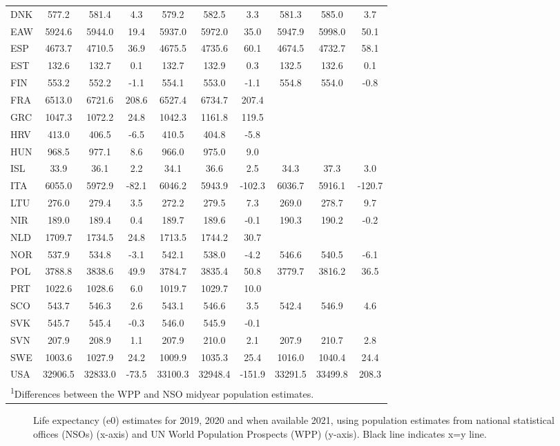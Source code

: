 \documentclass[12pt]{article}
\begin{document}
\begin{table}[ht]
\begin{tabular}{lccc|ccc|ccc}
DNK & 577.2 & 581.4 & 4.3 & 579.2 & 582.5 & 3.3 & 581.3 & 585.0 & 3.7\\
EAW & 5924.6 & 5944.0 & 19.4 & 5937.0 & 5972.0 & 35.0 & 5947.9 & 5998.0 & 50.1\\
ESP & 4673.7 & 4710.5 & 36.9 & 4675.5 & 4735.6 & 60.1 & 4674.5 & 4732.7 & 58.1\\
EST & 132.6 & 132.7 & 0.1 & 132.7 & 132.9 & 0.3 & 132.5 & 132.6 & 0.1\\
FIN & 553.2 & 552.2 & -1.1 & 554.1 & 553.0 & -1.1 & 554.8 & 554.0 & -0.8\\
FRA & 6513.0 & 6721.6 & 208.6 & 6527.4 & 6734.7 & 207.4 &  &  & \\
GRC & 1047.3 & 1072.2 & 24.8 & 1042.3 & 1161.8 & 119.5 &  &  & \\
HRV & 413.0 & 406.5 & -6.5 & 410.5 & 404.8 & -5.8 &  &  & \\
HUN & 968.5 & 977.1 & 8.6 & 966.0 & 975.0 & 9.0 &  &  & \\
ISL & 33.9 & 36.1 & 2.2 & 34.1 & 36.6 & 2.5 & 34.3 & 37.3 & 3.0\\
ITA & 6055.0 & 5972.9 & -82.1 & 6046.2 & 5943.9 & -102.3 & 6036.7 & 5916.1 & -120.7\\
LTU & 276.0 & 279.4 & 3.5 & 272.2 & 279.5 & 7.3 & 269.0 & 278.7 & 9.7\\
NIR & 189.0 & 189.4 & 0.4 & 189.7 & 189.6 & -0.1 & 190.3 & 190.2 & -0.2\\
NLD & 1709.7 & 1734.5 & 24.8 & 1713.5 & 1744.2 & 30.7 &  &  & \\
NOR & 537.9 & 534.8 & -3.1 & 542.1 & 538.0 & -4.2 & 546.6 & 540.5 & -6.1\\
POL & 3788.8 & 3838.6 & 49.9 & 3784.7 & 3835.4 & 50.8 & 3779.7 & 3816.2 & 36.5\\
PRT & 1022.6 & 1028.6 & 6.0 & 1019.7 & 1029.7 & 10.0 &  &  & \\
SCO & 543.7 & 546.3 & 2.6 & 543.1 & 546.6 & 3.5 & 542.4 & 546.9 & 4.6\\
SVK & 545.7 & 545.4 & -0.3 & 546.0 & 545.9 & -0.1 &  &  & \\
SVN & 207.9 & 208.9 & 1.1 & 207.9 & 210.0 & 2.1 & 207.9 & 210.7 & 2.8\\
SWE & 1003.6 & 1027.9 & 24.2 & 1009.9 & 1035.3 & 25.4 & 1016.0 & 1040.4 & 24.4\\
USA & 32906.5 & 32833.0 & -73.5 & 33100.3 & 32948.4 & -151.9 & 33291.5 & 33499.8 & 208.3\\
\bottomrule
\multicolumn{9}{l}{\textsuperscript{1}Differences between the WPP and NSO midyear population estimates.} \\
\end{tabular}
\end{table}

\begin{figure}[ht!]
    \centering
    \caption{Life expectancy (e0) estimates for 2019, 2020 and when available 2021, using population estimates from national statistical offices (NSOs) (x-axis) and UN World Population Prospects (WPP) (y-axis). Black line indicates x=y line.}
    \label{fig:figure-a8}
\end{figure}

\clearpage
\end{document}
